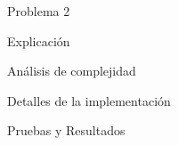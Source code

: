 \begin{section}{Problema 2}
	
	\begin{subsection}{Explicación}

		\begin{subsubsection}{Análisis de complejidad}

		\end{subsubsection}
	\end{subsection}

	\begin{subsection}{Detalles de la implementación}
	
	\end{subsection}

	\begin{subsection}{Pruebas y Resultados}
		
	\end{subsection}
\end{section}

